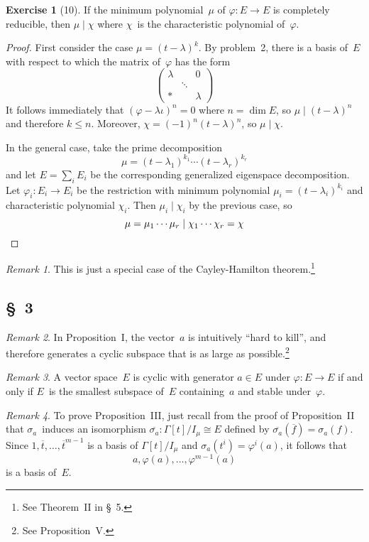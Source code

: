 \documentclass[letterpaper,12pt]{article}
\newcommand{\iso}{\cong}
\newcommand{\divides}{\mid}
\newcommand{\proj}[1]{\overline{#1}}
\theoremstyle{definition}
\newtheorem*{exer}{Exercise}
\theoremstyle{remark}
\newtheorem*{rmk}{Remark}
\begin{document}
\begin{exer}[10]
If the minimum polynomial~\(\mu\) of \(\varphi:E\to E\) is completely reducible, then \(\mu\divides\chi\) where \(\chi\)~is the characteristic polynomial of~\(\varphi\).
\end{exer}
\begin{proof}
First consider the case \(\mu=(t-\lambda)^k\). By problem~2, there is a basis of~\(E\) with respect to which the matrix of~\(\varphi\) has the form
\[\begin{pmatrix}
\lambda&&0\\
&\ddots&\\
*&&\lambda
\end{pmatrix}\]
It follows immediately that \((\varphi-\lambda\iota)^n=0\) where \(n=\dim E\), so \(\mu\divides(t-\lambda)^n\) and therefore \(k\le n\). Moreover, \(\chi=(-1)^n(t-\lambda)^n\), so \(\mu\divides\chi\).

In the general case, take the prime decomposition
\[\mu=(t-\lambda_1)^{k_1}\cdots(t-\lambda_r)^{k_r}\]
and let \(E=\sum_i E_i\) be the corresponding generalized eigenspace decomposition. Let \(\varphi_i:E_i\to E_i\) be the restriction with minimum polynomial \(\mu_i=(t-\lambda_i)^{k_i}\) and characteristic polynomial \(\chi_i\). Then \(\mu_i\divides\chi_i\) by the previous case, so
\[\mu=\mu_1\cdots\mu_r\divides\chi_1\cdots\chi_r=\chi\qedhere\]
\end{proof}
\begin{rmk}
This is just a special case of the Cayley-Hamilton theorem.\footnote{See Theorem~II in \S~5.}
\end{rmk}

\subsection*{\S~3}
\begin{rmk}
In Proposition~I, the vector~\(a\) is intuitively ``hard to kill'', and therefore generates a cyclic subspace that is as large as possible.\footnote{See Proposition~V.}
\end{rmk}

\begin{rmk}
A vector space~\(E\) is cyclic with generator \(a\in E\) under \(\varphi:E\to E\) if and only if \(E\)~is the smallest subspace of~\(E\) containing~\(a\) and stable under~\(\varphi\).
\end{rmk}

\begin{rmk}
To prove Proposition~III, just recall from the proof of Proposition~II that \(\sigma_a\)~induces an isomorphism \(\proj{\sigma_a}:\Gamma[t]/I_{\mu}\iso E\) defined by \(\proj{\sigma_a}(\proj{f})=\sigma_a(f)\). Since \(1,\proj{t},\ldots,\proj{t}^{m-1}\) is a basis of \(\Gamma[t]/I_{\mu}\) and \(\sigma_a(t^i)=\varphi^i(a)\), it follows that
\[a,\varphi(a),\ldots,\varphi^{m-1}(a)\]
is a basis of~\(E\).
\end{rmk}
\end{document}
